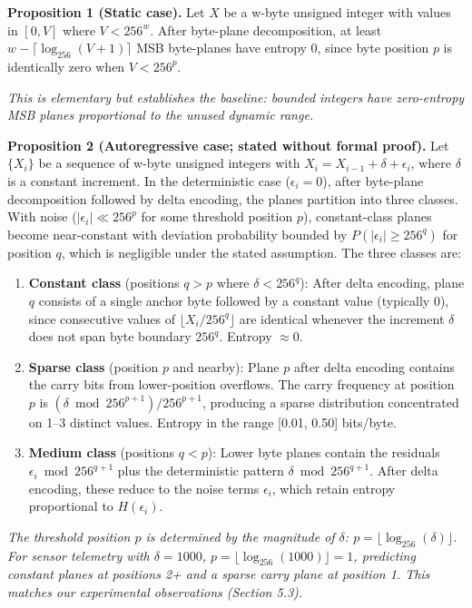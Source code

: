 \documentclass[
  11pt,
  letterpaper,
]{article}
\makeatletter
\renewcommand{\_}{\bpd@origunderscore\allowbreak}
\makeatother
\begin{document}
\textbf{Proposition 1 (Static case).} Let \(X\) be a w-byte unsigned
integer with values in \([0, V]\) where \(V < 256^w\). After byte-plane
decomposition, at least \(w - \lceil \log_{256}(V+1) \rceil\) MSB
byte-planes have entropy 0, since byte position \(p\) is identically
zero when \(V < 256^p\).

\emph{This is elementary but establishes the baseline: bounded integers
have zero-entropy MSB planes proportional to the unused dynamic range.}

\textbf{Proposition 2 (Autoregressive case; stated without formal
proof).} Let \(\{X_i\}\) be a sequence of w-byte unsigned integers with
\(X_i = X_{i-1} + \delta + \epsilon_i\), where \(\delta\) is a constant
increment. In the deterministic case (\(\epsilon_i = 0\)), after
byte-plane decomposition followed by delta encoding, the planes
partition into three classes. With noise (\(|\epsilon_i| \ll 256^p\) for
some threshold position \(p\)), constant-class planes become
near-constant with deviation probability bounded by
\(P(|\epsilon_i| \ge 256^q)\) for position \(q\), which is negligible
under the stated assumption. The three classes are:

\begin{enumerate}
\def\labelenumi{\arabic{enumi}.}
\item
  \textbf{Constant class} (positions \(q > p\) where
  \(\delta < 256^{q}\)): After delta encoding, plane \(q\) consists of a
  single anchor byte followed by a constant value (typically 0), since
  consecutive values of \(\lfloor X_i / 256^q \rfloor\) are identical
  whenever the increment \(\delta\) does not span byte boundary
  \(256^q\). Entropy \(\approx 0\).
\item
  \textbf{Sparse class} (position \(p\) and nearby): Plane \(p\) after
  delta encoding contains the carry bits from lower-position overflows.
  The carry frequency at position \(p\) is
  \((\delta \bmod 256^{p+1}) / 256^{p+1}\), producing a sparse
  distribution concentrated on 1--3 distinct values. Entropy in the
  range {[}0.01, 0.50{]} bits/byte.
\item
  \textbf{Medium class} (positions \(q < p\)): Lower byte planes contain
  the residuals \(\epsilon_i \bmod 256^{q+1}\) plus the deterministic
  pattern \(\delta \bmod 256^{q+1}\). After delta encoding, these reduce
  to the noise terms \(\epsilon_i\), which retain entropy proportional
  to \(H(\epsilon_i)\).
\end{enumerate}

\emph{The threshold position \(p\) is determined by the magnitude of
\(\delta\): \(p = \lfloor \log_{256}(\delta) \rfloor\). For sensor
telemetry with \(\delta = 1000\),
\(p = \lfloor \log_{256}(1000) \rfloor = 1\), predicting constant planes
at positions 2+ and a sparse carry plane at position 1. This matches our
experimental observations (Section 5.3).}
\end{document}
